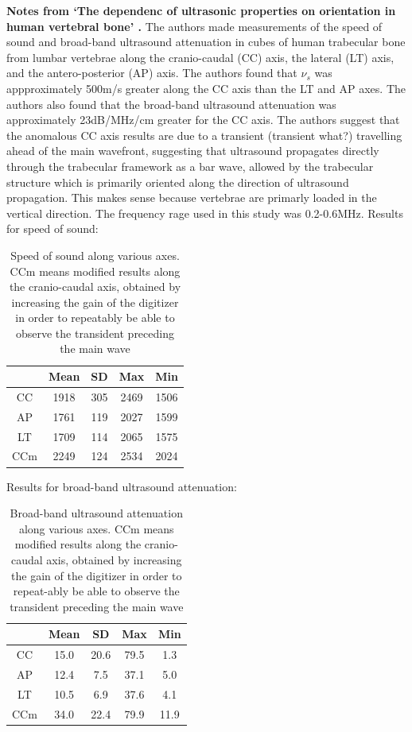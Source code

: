 \documentclass[11pt,titlepage]{article} %
\begin{document}
\textbf{Notes from `The dependenc of ultrasonic properties on orientation in human vertebral bone' \cite{nicholson1994dependence}.}
The authors made measurements of the speed of sound and broad-band ultrasound attenuation in cubes of human trabecular bone from lumbar vertebrae along the cranio-caudal (CC) axis, the lateral (LT) axis, and the antero-posterior (AP) axis.
The authors found that $\nu_s$ was appproximately 500m/s greater along the CC axis than the LT and AP axes. The authors also found that the broad-band ultrasound attenuation was approximately 23dB/MHz/cm greater for the CC axis. The authors suggest that the anomalous CC axis results are due to a transient (transient what?) travelling ahead of the main wavefront, suggesting that ultrasound propagates directly through the trabecular framework as a bar wave, allowed by the  trabecular structure which is primarily oriented along the direction of ultrasound propagation. This makes sense because vertebrae are primarly loaded in the vertical direction. The frequency rage used in this study was 0.2-0.6MHz. Results for speed of sound:

\begin{table}[!h]
\begin{center}
  \begin{tabular}{| c | c | c | c | c | }
    \hline
     & Mean & SD & Max & Min \\ \hline
     CC & 1918 & 305 & 2469 & 1506 \\ 
     AP & 1761 & 119 & 2027 & 1599 \\ 
     LT & 1709 & 114 & 2065 & 1575 \\ 
     CCm & 2249 & 124 & 2534 & 2024 \\
    \hline
  \end{tabular}
\end{center}
\caption{Speed of sound along various axes. CCm means modified results along the cranio-caudal axis, obtained by increasing the gain of the digitizer in order to repeatably be able to observe the transident preceding the main wave}
\end{table}
 
 Results for broad-band ultrasound attenuation:
 \begin{table}[!h]
\begin{center}
  \begin{tabular}{| c | c | c | c | c | }
    \hline
     & Mean & SD & Max & Min \\ \hline
     CC & 15.0 & 20.6 & 79.5 & 1.3 \\ 
     AP & 12.4 & 7.5 & 37.1 & 5.0 \\ 
     LT & 10.5 & 6.9 & 37.6 & 4.1 \\ 
     CCm & 34.0 & 22.4 & 79.9 & 11.9 \\
    \hline
  \end{tabular}
\end{center}
\caption{Broad-band ultrasound attenuation along various axes. CCm means modified results along the cranio-caudal axis, obtained by increasing the gain of the digitizer in order to repeat-ably be able to observe the transident preceding the main wave}
\end{table}
\end{document}
